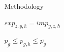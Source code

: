 \documentclass[aspectratio=169]{beamer}
\begin{document}
\begin{frame}{Methodology}
\begin{minipage}[t]{0.78\textwidth}
        \begin{coloredblock}[blue][][][2.35cm]
            \vspace{0.35cm}
            \begin{center}
                \small$exp_{z,y,h} = imp_{y,z,h}$
            \end{center}
        \end{coloredblock}

        \begin{coloredblock}[blue][][][2.35cm]
            \vspace{0.35cm}
            \begin{center}
                \small$\underline{p_g} \leq p_{g,h} \leq \overline{p_g}$
            \end{center}
        \end{coloredblock}
    \end{minipage}
    
\end{frame}
\end{document}

